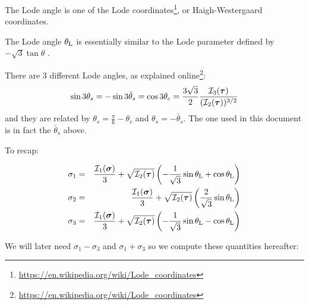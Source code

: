 \begin{remark} The Lode angle is one of the Lode 
coordinates\footnote{\url{https://en.wikipedia.org/wiki/Lode_coordinates}},
or Haigh-Westergaard coordinates. 
\end{remark}

\begin{remark} The Lode angle $\theta_{\rm L}$ is essentially similar to the 
Lode parameter  defined by $-\sqrt{3}\tan\theta$ \cite{owhi}.
\end{remark}

\begin{remark}
There are 3 different Lode angles, as 
explained online\footnote{\url{https://en.wikipedia.org/wiki/Lode_coordinates}}:
\[
\sin 3\theta_s = -\sin 3 \bar{\theta}_s = \cos 3\theta_c = \frac{3\sqrt{3}}{2}\frac{{\cal I}_3({\bm \tau})}{({\cal I}_2({\bm \tau}))^{3/2}}
\]
and they are related by $\theta_s = \frac{\pi}{6}-\theta_c$ and $\theta_s = -\bar{\theta}_s$. 
The one used in this document is in fact the $\bar{\theta}_s$ above.
\label{rq:signs}
\end{remark}

To recap:
\begin{mdframed}[backgroundcolor=blue!5]
\begin{eqnarray}
\sigma_1 &=& \frac{{\cal I}_1({\bm \sigma})}{3} + \sqrt{{\cal I}_2({\bm \tau})} \left(-\frac{1}{\sqrt{3}}\sin \theta_{\rm L}  +\cos\theta_{\rm L} \right) \label{eq:sigma1} \\ 
\sigma_2 &=& \frac{{\cal I}_1({\bm \sigma})}{3} + \sqrt{{\cal I}_2({\bm \tau})} \left(\frac{2}{\sqrt{3}}\sin 
\theta_{\rm L}   \right)    \label{eq:sigma2} \\
\sigma_3 &=& \frac{{\cal I}_1({\bm \sigma})}{3} + \sqrt{{\cal I}_2({\bm \tau})} \left(-\frac{1}{\sqrt{3}}\sin \theta_{\rm L}  - \cos \theta_{\rm L} \right)    \label{eq:sigma3}
\end{eqnarray}
\end{mdframed}


We will later need $\sigma_1-\sigma_3$ and $\sigma_1+\sigma_3$ so we compute these
quantities hereafter:


